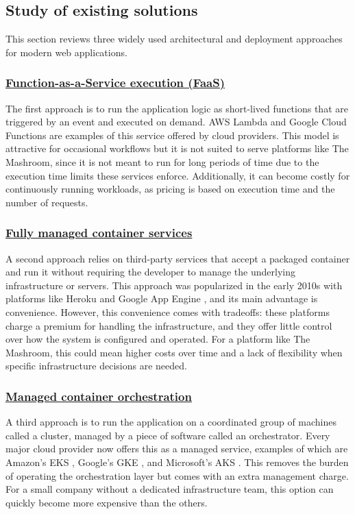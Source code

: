 \subsection{Study of existing solutions}
This section reviews three widely used architectural and deployment approaches for modern web applications.

\subsubsection*{\underline{Function-as-a-Service execution (FaaS) \cite{faas}}}
The first approach is to run the application logic as short-lived functions 
that are triggered by an event and executed on demand. AWS Lambda and Google 
Cloud Functions are examples of this service offered by cloud providers. This 
model is attractive for occasional workflows but it is not suited to serve 
platforms like The Mashroom, since it is not meant to run for long periods of time 
due to the execution time limits these services enforce. Additionally, it can 
become costly for continuously running workloads, as pricing is based on 
execution time and the number of requests.

\subsubsection*{\underline{Fully managed container services}}
A second approach relies on third-party services that accept a packaged container 
and run it without requiring the developer to manage the underlying infrastructure 
or servers. This approach was popularized in the early 2010s with platforms like 
Heroku and Google App Engine \cite{heroku2011}, and its main advantage is convenience.
However, this convenience comes with tradeoffs: these platforms charge a premium 
for handling the infrastructure, and they offer little control over how the system 
is configured and operated. For a platform like The Mashroom, this could mean higher 
costs over time and a lack of flexibility when specific infrastructure decisions 
are needed.

\subsubsection*{\underline{Managed container orchestration}}
A third approach is to run the application on a coordinated group of machines 
called a cluster, managed by a piece of software called an orchestrator. Every 
major cloud provider now offers this as a managed service, examples of which 
are Amazon's EKS \cite{aws_eks}, Google's GKE \cite{google_gke}, and 
Microsoft's AKS \cite{microsoft_aks}. This removes the burden of operating 
the orchestration layer but comes with an extra management charge. For a small 
company without a dedicated infrastructure team, this option can quickly become 
more expensive than the others.


